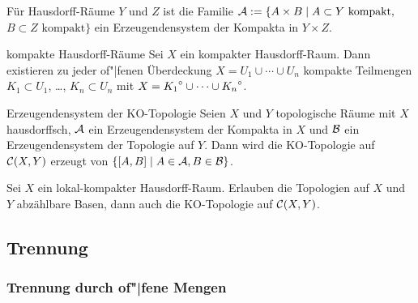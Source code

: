 \begin{Bsp}
    Für Hausdorff-Räume $Y$ und $Z$ ist die Familie
    $\mathcal{A} := \{A \times B \;|\; A \subset Y \text{ kompakt},\;$ \\
    $B \subset Z \text{ kompakt}\}$ ein Erzeugendensystem der Kompakta in
    $Y \times Z$.
\end{Bsp}

\begin{Lemma}{kompakte Hausdorff-Räume}
    Sei $X$ ein kompakter Hausdorff-Raum.
    Dann existieren zu jeder of"|fenen Überdeckung
    $X = U_1 \cup \dotsb \cup U_n$ kompakte Teilmengen $K_1 \subset U_1$,
    \dots, $K_n \subset U_n$ mit
    $X = {K_1}^\circ \cup \dotsb \cup {K_n}^\circ$.
\end{Lemma}

\begin{Satz}{Erzeugendensystem der KO-Topologie}
    Seien $X$ und $Y$ topologische Räume mit $X$ hausdorffsch,
    $\mathcal{A}$ ein Erzeugendensystem der Kompakta in $X$ und
    $\mathcal{B}$ ein Erzeugendensystem der Topologie auf $Y$.
    Dann wird die KO-Topologie auf $\mathcal{C}(X, Y)$ erzeugt von
    $\{[A, B] \;|\; A \in \mathcal{A}, B \in \mathcal{B}\}$.
\end{Satz}

\begin{Kor}
    Sei $X$ ein lokal-kompakter Hausdorff-Raum.
    Erlauben die Topologien auf $X$ und $Y$ abzählbare Basen, dann auch
    die KO-Topologie auf $\mathcal{C}(X, Y)$.
\end{Kor}

\pagebreak

\subsection{%
    Trennung%
}

\subsubsection{%
    Trennung durch of"|fene Mengen%
}

